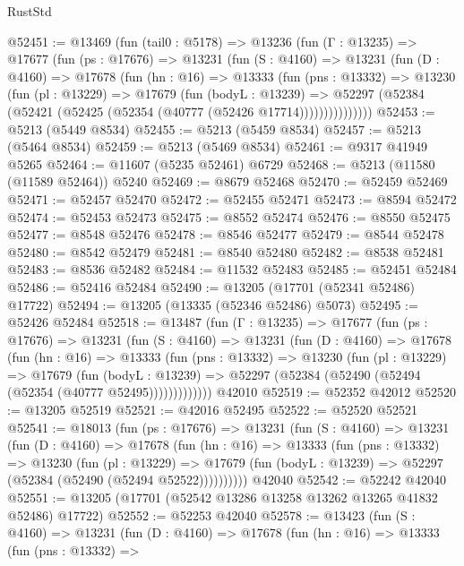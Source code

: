 \begin{lexlean}{RustStd}
\begin{coremodule}
@52451 := @13469
    (fun (tail0 : @5178) =>
    @13236
      (fun (Γ : @13235) =>
      @17677
        (fun (ps : @17676) =>
        @13231
          (fun (S : @4160) =>
          @13231
            (fun (D : @4160) =>
            @17678
              (fun (hn : @16) =>
              @13333
                (fun (pns : @13332) =>
                @13230
                  (fun (pl : @13229) =>
                  @17679
                    (fun (bodyL : @13239) =>
                    @52297 (@52384 (@52421 (@52425 (@52354 (@40777 (@52426 @17714)))))))))))))))
@52453 := @5213 (@5449 @8534)
@52455 := @5213 (@5459 @8534)
@52457 := @5213 (@5464 @8534)
@52459 := @5213 (@5469 @8534)
@52461 := @9317 @41949 @5265
@52464 := @11607 (@5235 @52461) @6729
@52468 := @5213 (@11580 (@11589 @52464)) @5240
@52469 := @8679 @52468
@52470 := @52459 @52469
@52471 := @52457 @52470
@52472 := @52455 @52471
@52473 := @8594 @52472
@52474 := @52453 @52473
@52475 := @8552 @52474
@52476 := @8550 @52475
@52477 := @8548 @52476
@52478 := @8546 @52477
@52479 := @8544 @52478
@52480 := @8542 @52479
@52481 := @8540 @52480
@52482 := @8538 @52481
@52483 := @8536 @52482
@52484 := @11532 @52483
@52485 := @52451 @52484
@52486 := @52416 @52484
@52490 := @13205 (@17701 (@52341 @52486) @17722)
@52494 := @13205 (@13335 (@52346 @52486) @5073)
@52495 := @52426 @52484
@52518 := @13487
    (fun (Γ : @13235) =>
    @17677
      (fun (ps : @17676) =>
      @13231
        (fun (S : @4160) =>
        @13231
          (fun (D : @4160) =>
          @17678
            (fun (hn : @16) =>
            @13333
              (fun (pns : @13332) =>
              @13230
                (fun (pl : @13229) =>
                @17679
                  (fun (bodyL : @13239) =>
                  @52297 (@52384 (@52490 (@52494 (@52354 (@40777 @52495)))))))))))))
    @42010
@52519 := @52352 @42012
@52520 := @13205 @52519
@52521 := @42016 @52495
@52522 := @52520 @52521
@52541 := @18013
    (fun (ps : @17676) =>
    @13231
      (fun (S : @4160) =>
      @13231
        (fun (D : @4160) =>
        @17678
          (fun (hn : @16) =>
          @13333
            (fun (pns : @13332) =>
            @13230
              (fun (pl : @13229) =>
              @17679 (fun (bodyL : @13239) => @52297 (@52384 (@52490 (@52494 @52522))))))))))
    @42040
@52542 := @52242 @42040
@52551 := @13205 (@17701 (@52542 @13286 @13258 @13262 @13265 @41832 @52486) @17722)
@52552 := @52253 @42040
@52578 := @13423
    (fun (S : @4160) =>
    @13231
      (fun (D : @4160) =>
      @17678
        (fun (hn : @16) =>
        @13333
          (fun (pns : @13332) =>

\end{coremodule}
\end{lexlean}
